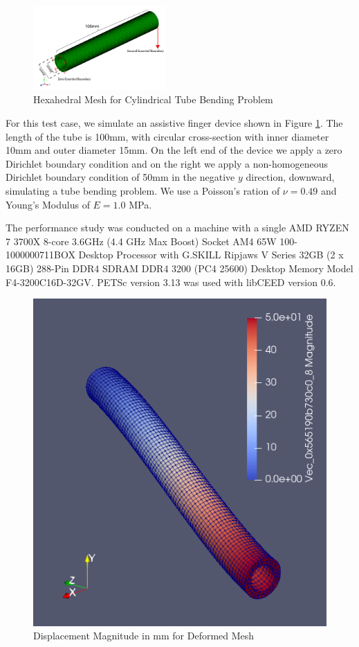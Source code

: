 \begin{figure}[ht!]
 \begin{center}
      \includegraphics[width=0.45\textwidth]{../img/cylinder.pdf}
\end{center}
\caption{Hexahedral Mesh for Cylindrical Tube Bending Problem}
    \label{fig:hyper-cylinder}
\end{figure}

For this test case, we simulate an assistive finger device shown in Figure \ref{fig:hyper-cylinder}.
The length of the tube is 100mm, with circular cross-section with inner diameter 10mm and outer diameter 15mm.
On the left end of the device we apply a zero Dirichlet boundary condition and on the right we apply a non-homogeneous Dirichlet boundary condition of 50mm in the negative $y$ direction, downward, simulating a tube bending problem.
We use a Poisson's ration of $\nu = 0.49$ and Young's Modulus of $E = 1.0$ MPa.

The performance study was conducted on a machine with a single AMD RYZEN 7 3700X 8-core 3.6GHz (4.4 GHz Max Boost) Socket AM4 65W 100-1000000711BOX Desktop Processor with G.SKILL Ripjaws V Series 32GB (2 x 16GB) 288-Pin DDR4 SDRAM DDR4 3200 (PC4 25600) Desktop Memory Model F4-3200C16D-32GV.
PETSc \cite{petsc-user-ref} version 3.13 was used with libCEED \cite{libceed} version 0.6.

\begin{figure}[ht!]
\begin{center}
\includegraphics[angle=0,width=0.55\linewidth]{../img/tube27.png}
\end{center}
\caption{Displacement Magnitude in mm for Deformed Mesh}
\label{fig:hyper-press} 
\end{figure}

